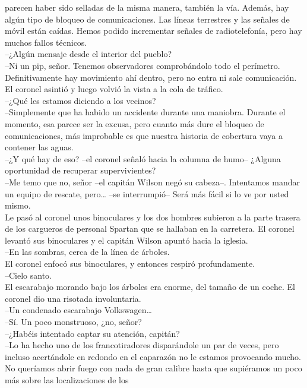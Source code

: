 parecen haber sido selladas de la misma manera, también la vía. Además,
hay algún tipo de bloqueo de comunicaciones. Las líneas terrestres y las
señales de móvil están caídas. Hemos podido incrementar señales de
radiotelefonía, pero hay muchos fallos técnicos.\\
--¿Algún mensaje desde el interior del pueblo?\\
--Ni un pip, señor. Tenemos observadores comprobándolo todo el
perímetro. Definitivamente hay movimiento ahí dentro, pero no entra ni
sale comunicación.\\
El coronel asintió y luego volvió la vista a la cola de tráfico.\\
--¿Qué les estamos diciendo a los vecinos?\\
--Simplemente que ha habido un accidente durante una maniobra. Durante
el momento, esa parece ser la excusa, pero cuanto más dure el bloqueo de
comunicaciones, más improbable es que nuestra historia de cobertura vaya
a contener las aguas.\\
--¿Y qué hay de eso? --el coronel señaló hacia la columna de humo--
¿Alguna oportunidad de recuperar supervivientes?\\
--Me temo que no, señor --el capitán Wilson negó su cabeza--. Intentamos
mandar un equipo de rescate, pero\ldots{} --se interrumpió-- Será más
fácil si lo ve por usted mismo.\\
Le pasó al coronel unos binoculares y los dos hombres subieron a la
parte trasera de los cargueros de personal Spartan que se hallaban en la
carretera. El coronel levantó sus binoculares y el capitán Wilson apuntó
hacia la iglesia.\\
--En las sombras, cerca de la línea de árboles.\\
El coronel enfocó sus binoculares, y entonces respiró profundamente.\\
--Cielo santo.\\
El escarabajo morando bajo los árboles era enorme, del tamaño de un
coche. El coronel dio una risotada involuntaria.\\
--Un condenado escarabajo Volkswagen\ldots{}\\
--Sí. Un poco monstruoso, ¿no, señor?\\
--¿Habéis intentado captar su atención, capitán?\\
--Lo ha hecho uno de los francotiradores disparándole un par de veces,
pero incluso acertándole en redondo en el caparazón no le estamos
provocando mucho. No queríamos abrir fuego con nada de gran calibre
hasta que supiéramos un poco más sobre las localizaciones de los
